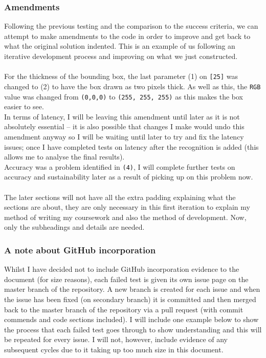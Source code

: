 \documentclass[9pt]{article}
\begin{document}
\subsubsection{Amendments}
Following the previous testing and the comparison to the success criteria, we can attempt to make amendments to the code in order to improve and get back to what the original solution indented. This is an example of us following an iterative development process and improving on what we just constructed. \\\\
For the thickness of the bounding box, the last parameter (1) on \texttt{[25]} was changed to (2) to  have the box drawn as two pixels thick. As well as this, the \texttt{RGB} value was changed from \texttt{(0,0,0)} to \texttt{(255, 255, 255)} as this makes the box easier to see.\\
In terms of latency, I will be leaving this amendment until later as it is not absolutely essential -- it is also possible that changes I make would undo this amendment anyway so I will be waiting until later to try and fix the latency issues; once I have completed tests on latency after the recognition is added (this allows me to analyse the final results). \\
Accuracy was a problem identified in \texttt{(4)}, I will complete further tests on accuracy and sustainability later as a result of picking up on this problem now. \\\\
The later sections will not have all the extra padding explaining what the sections are about, they are only necessary in this first iteration to explain my method of writing my coursework and also the method of development. Now, only the subheadings and details are needed.
\subsubsection{A note about GitHub incorporation}
Whilst I have decided not to include GitHub incorporation evidence to the document (for size reasons), each failed test is given its own issue page on the master branch of the repository. A new branch is created for each issue and when the issue has been fixed (on secondary branch) it is committed and then merged back to the master branch of the repository via a pull request (with commit commends and code sections included). I will include one example below to show the process that each failed test goes through to show understanding and this will be repeated for every issue. I will not, however, include evidence of any subsequent cycles due to it taking up too much size in this document.
\end{document}

